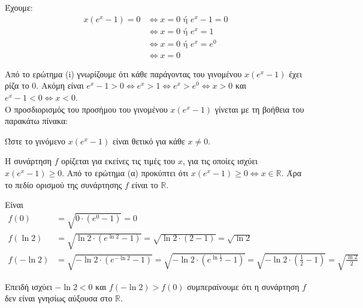 \begin{alist}
\item 
\begin{rlist}
\item Έχουμε:
\begin{align*}
x(e^x - 1) = 0 &\Leftrightarrow x = 0 \text{ ή } e^x - 1 = 0 \\
&\Leftrightarrow x = 0 \text{ ή } e^x = 1 \\
&\Leftrightarrow x = 0 \text{ ή } e^x = e^0 \\
&\Leftrightarrow x = 0
\end{align*}
\item Από το ερώτημα (i) γνωρίζουμε ότι κάθε παράγοντας του γινομένου $x(e^x - 1)$ έχει ρίζα το $0$. Ακόμη είναι $e^x - 1 > 0 \Leftrightarrow e^x > 1 \Leftrightarrow e^x > e^0 \Leftrightarrow x > 0$ και $e^x - 1 < 0 \Leftrightarrow x < 0$. \\
Ο προσδιορισμός του προσήμου του γινομένου $x(e^x - 1)$ γίνεται με τη βοήθεια του παρακάτω πίνακα:
\begin{center}
\end{center}
Ώστε το γινόμενο $x(e^x - 1)$ είναι θετικό για κάθε $x \ne 0$.
\end{rlist}
\item 
\begin{rlist}
\item Η συνάρτηση $f$ ορίζεται για εκείνες τις τιμές του $x$, για τις οποίες ισχύει $x(e^x - 1) \ge 0$. Από το ερώτημα (α) προκύπτει ότι $x(e^x - 1) \ge 0 \Leftrightarrow x \in \mathbb{R}$. Άρα το πεδίο ορισμού της συνάρτησης $f$ είναι το $\mathbb{R}$.
\item Είναι
\begin{align*}
f(0) &= \sqrt{0\cdot(e^0-1)} = 0 \\
f(\ln 2) &= \sqrt{\ln 2\cdot(e^{\ln 2}-1)} = \sqrt{\ln 2\cdot(2-1)} = \sqrt{\ln 2} \\
f(-\ln 2) &= \sqrt{-\ln 2\cdot(e^{-\ln 2}-1)} = \sqrt{-\ln 2\cdot\left(e^{\ln \frac{1}{2}}-1\right)} = \sqrt{-\ln 2\cdot\left(\frac{1}{2}-1\right)} = \sqrt{\frac{\ln 2}{2}}
\end{align*}
\item Επειδή ισχύει $-\ln 2 < 0$ και $f(-\ln 2) > f(0)$ συμπεραίνουμε ότι η συνάρτηση $f$ δεν είναι γνησίως αύξουσα στο $\mathbb{R}$.
\end{rlist}
\end{alist}

